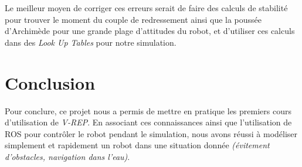 \documentclass[12pt, openany]{report}
\begin{document}
Le meilleur moyen de corriger ces erreurs serait de faire des calculs de stabilité pour trouver le moment du couple de redressement ainsi que la poussée d'Archimède pour une grande plage d'attitudes du robot, et d'utiliser ces calculs dans des \textit{Look Up Tables} pour notre simulation.

\section*{Conclusion}
Pour conclure, ce projet nous a permis de mettre en pratique les premiers cours d'utilisation de \textit{V-REP}. En associant ces connaissances ainsi que l'utilisation de ROS pour contrôler le robot pendant le simulation, nous avons réussi à modéliser simplement et rapidement un robot dans une situation donnée \textit{(évitement d'obstacles, navigation dans l'eau)}.

\listoffigures
\end{document}
